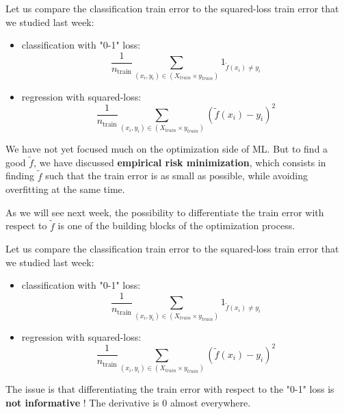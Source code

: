 \documentclass[usenames,dvipsnames,french]{beamer}
\begin{document}
\begin{frame}
    Let us compare the classification train error to the squared-loss train error that we studied last week:

    \begin{itemize}
    	\item classification with "0-1" loss:
	    \begin{equation}
		\frac{1}{n_{\text{train}}}\sum_{(x_i, y_i)\in (X_{train}\times y_{train})} 1_{{\tilde{f}(x_i)\neq y_i}}
	    \end{equation}
	\item regression with squared-loss:
	    \begin{equation}
		\frac{1}{n_{\text{train}}}\sum_{(x_i, y_i)\in (X_{train}\times y_{train})} (\tilde{f}(x_i)-y_i)^2
	    \end{equation}
    \end{itemize}

    We have not yet focused much on the optimization side of ML. But to find a good $\tilde{f}$, we have discussed \textbf{empirical risk minimization}, which consists in finding $\tilde{f}$ such that the train error is as small as possible, while avoiding overfitting at the same time.

    As we will see next week, the possibility to differentiate the train error with respect to $ \tilde{f}$ is one of the building blocks of the optimization process.

\end{frame}

\begin{frame}
    Let us compare the classification train error to the squared-loss train error that we studied last week:

    \begin{itemize}
    	\item classification with "0-1" loss:
	    \begin{equation}
		\frac{1}{n_{\text{train}}}\sum_{(x_i, y_i)\in (X_{train}\times y_{train})} 1_{{\tilde{f}(x_i)\neq y_i}}
	    \end{equation}
	\item regression with squared-loss:
	    \begin{equation}
		\frac{1}{n_{\text{train}}}\sum_{(x_i, y_i)\in (X_{train}\times y_{train})} (\tilde{f}(x_i)-y_i)^2
	    \end{equation}
    \end{itemize}

    The issue is that differentiating the train error with respect to the "0-1" loss is \textbf{not informative} ! The derivative is $0$ almost everywhere.


\end{frame}
\end{document}
